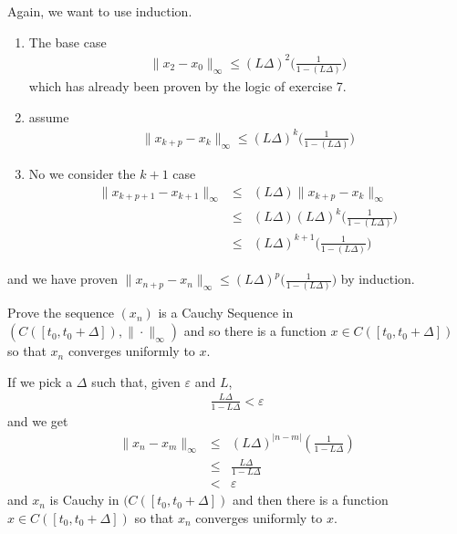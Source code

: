 \documentclass[11pt]{SelfArxOneColBMN}
\begin{document}
\begin{solution}
Again, we want to use induction.
\begin{enumerate}
  \item The base case
  \begin{eqnarray*}
    \|x_{2} - x_0\|_\infty \leq (L \Delta)^2  \biggl ( \frac{1}{1 - (L \Delta)} \biggr) 
  \end{eqnarray*}
  which has already been proven by the logic of exercise 7.
  \item assume
  \begin{eqnarray*}
    \|x_{k+p} - x_k\|_\infty \leq (L \Delta)^k  \biggl ( \frac{1}{1 - (L \Delta)} \biggr)
  \end{eqnarray*}
  \item No we consider the $k + 1$ case
  \begin{eqnarray*}
    \|x_{k+p + 1} - x_{k + 1}\|_\infty &\leq& (L \Delta)  \biggl \|x_{k + p} - x_k\|_\infty\\
    &\leq& (L \Delta) (L \Delta)^k  \biggl ( \frac{1}{1 - (L \Delta)} \biggr)\\
    &\leq& (L \Delta)^{k+1}  \biggl ( \frac{1}{1 - (L \Delta)} \biggr)
  \end{eqnarray*}
\end{enumerate}
and we have proven $\|x_{n+p} - x_n\|_\infty \leq (L \Delta)^p  \biggl ( \frac{1}{1 - (L \Delta)} \biggr)$ by induction.
\end{solution}

\begin{exercise}
Prove the sequence $(x_n)$ is a Cauchy Sequence in $(C([t_0,t_0+\Delta]), \| \cdot \|_\infty)$
and so there is a function $x \in C([t_0,t_0+\Delta])$ so that $x_n$ converges
uniformly to $x$.
\end{exercise}

\begin{solution}
If we pick a $\Delta$ such that, given $\varepsilon$ and $L$,
\begin{eqnarray*}
  \frac{L\Delta}{1 - L\Delta} < \varepsilon
\end{eqnarray*}
and we get
\begin{eqnarray*}
  \|x_n - x_m\|_\infty &\leq& (L\Delta)^{|n - m|}(\frac{1}{1 - L\Delta})\\
  &\leq& \frac{L\Delta}{1 - L\Delta}\\
  &<& \varepsilon
\end{eqnarray*}
and $x_n$ is Cauchy in $(C([t_0,t_0+\Delta])$ and then there is a function $x \in C([t_0,t_0+\Delta])$ so that $x_n$ converges
uniformly to $x$.
\end{solution}
\end{document}
